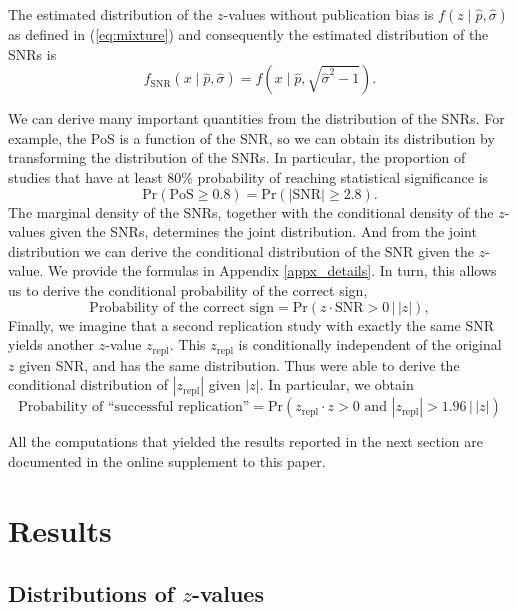 \documentclass[11pt]{article}
\renewcommand{\Pr}{\mathrm{Pr}}
\begin{document}
The estimated distribution of the $z$-values without publication bias is $f(z \mid \hat p,\hat \sigma)$ as defined in (\ref{eq:mixture}) and consequently the estimated distribution of the SNRs is
\begin{equation}
f_\text{SNR}(x \mid \hat p,\hat \sigma) = f(x \mid \hat p,\sqrt{\hat \sigma^2 -1}).
\end{equation}

We can derive many important quantities from the distribution of the SNRs. For example, the PoS is a function of the SNR, so we can obtain its distribution by transforming the distribution of the SNRs. In particular, the proportion of studies that have at least 80\% probability of reaching statistical significance is
\begin{equation}
\Pr(\text{PoS} \geq 0.8) = \Pr(|\text{SNR}| \geq 2.8).
\end{equation}
The marginal density of the SNRs, together with the conditional density of the $z$-values given the SNRs, determines the joint distribution. And from the joint  distribution we can derive the conditional distribution of the SNR given the $z$-value.
We provide the formulas in Appendix \ref{appx_details}. In turn, this allows us to derive the conditional probability of the correct sign,
\begin{equation}\label{eq:sign}
\text{Probability of the correct sign} = \Pr(z \cdot \text{SNR} > 0 \,\big|\, |z|),
\end{equation}
Finally, we imagine that a second replication study with exactly the same SNR yields another $z$-value $z_\text{repl}$. This  $z_\text{repl}$ is conditionally independent of the original $z$ given SNR, and has the same distribution. Thus \textcite{vanzwet2022large} were able to derive the conditional distribution of $|z_\text{repl}|$ given $|z|$. In particular, we obtain 
\begin{equation}\label{eq:repl}
\text{Probability of ``successful replication''} = \Pr(z_\text{repl} \cdot z > 0 \text{ and } |z_\text{repl}| > 1.96 \,\big|\, |z|) 
\end{equation}

All the computations that yielded the results reported in the next section are documented in the online supplement to this paper. 

\section{Results}

\subsection{Distributions of $z$-values}
\end{document}
